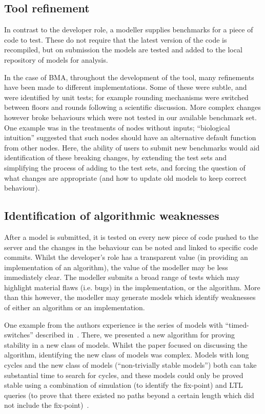 \documentclass[conference]{IEEEtran}
\begin{document}
\subsection{Tool refinement}

In contrast to the developer role, a modeller supplies benchmarks for
a piece of code to test. These do not require that the latest version
of the code is recompiled, but on submission the models are tested and
added to the local repository of models for analysis.

In the case of BMA, throughout the development of the tool, many
refinements have been made to different implementations. Some of these
were subtle, and were identified by unit tests; for example rounding
mechanisms were switched between floors and rounds following a
scientific discussion. More complex changes however broke behaviours
which were not tested in our available benchmark set. One example was
in the treatments of nodes without inputs; ``biological intuition''
suggested that such nodes should have an alternative default function
from other nodes. Here, the ability of users to submit new benchmarks
would aid identification of these breaking changes, by extending the
test sets and simplifying the process of adding to the test sets, and
forcing the question of what changes are appropriate (and how to
update old models to keep correct behaviour).


\subsection{Identification of algorithmic weaknesses}

After a model is submitted, it is tested on every new piece of code
pushed to the server and the changes in the behaviour can be noted and
linked to specific code commits. Whilst the developer's role has a
transparent value (in providing an implementation of an algorithm),
the value of the modeller may be less immediately clear. The modeller
submits a broad range of tests which may highlight material flaws
(i.e. bugs) in the implementation, or the algorithm. More than this
however, the modeller may generate models which identify weaknesses of
either an algorithm or an implementation.

One example from the authors experience is the series of models with
``timed-switches'' described in~\cite{cook-et-al:2014}. There, we
presented a new algorithm for proving stability in a new class of
models. Whilst the paper focused on discussing the algorithm,
identifying the new class of models was complex. Models with long
cycles and the new class of models (``non-trivially stable models'')
both can take substantial time to search for cycles, and these models
could only be proved stable using a combination of simulation (to
identify the fix-point) and LTL queries (to prove that there existed
no paths beyond a certain length which did not include the
fix-point)~\cite{claessen-et-al:2013}.
\end{document}
